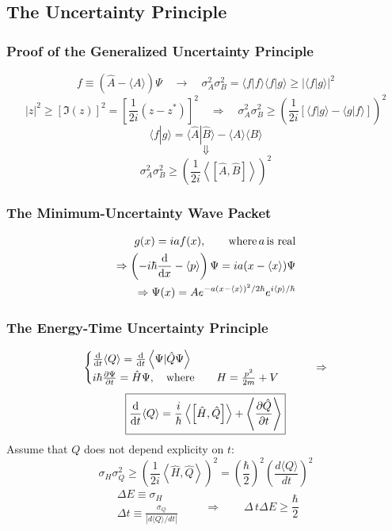 \documentclass[a4paper,12pt]{article}
\begin{document}
\subsection{The Uncertainty Principle}
\subsubsection{Proof of the Generalized Uncertainty Principle}
\[ f\equiv\left(\hat{A}-\langle A\rangle\right)\Psi \quad\rightarrow\quad 
   \sigma_A^2\sigma_B^2=\langle f|f\rangle\langle f|g\rangle\geq|\langle f| g\rangle|^2
\]
\[ |z|^2\geq[\Im(z)]^2=\left[\frac{1}{2i}(z-z^*)\right] ^2 \quad\Rightarrow\quad
  \sigma_A^2\sigma_B^2\geq\left(\frac{1}{2i}\left[
         \langle f| g\rangle -\langle g|f \rangle
  \right] \right)^2      
\]
\[\langle f| g\rangle=\langle \hat{A}|\hat{B}\rangle-\langle A\rangle\langle B\rangle\]
\[\Downarrow\]
$${ \boxed{\sigma_A^2\sigma_B^2\geq \left(\frac{1}{2i}\left\langle \left[\hat{A},\hat{B}\right] \right\rangle \right)^2  } }$$

\subsubsection{The Minimum-Uncertainty Wave Packet}
\[\begin{aligned}
       g(x)=iaf(x),\qquad\text{where} \,a\, \text{is real} \\ \Rightarrow
       \left(-i\hbar\dv{x}-\langle p\rangle\right) \Psi = ia(x-\langle x\rangle)\Psi \\ \Rightarrow
       \Psi(x) = Ae^{-a(x-\langle x\rangle)^2/2\hbar}e^{i\langle p\rangle/\hbar}
\end{aligned}
\]
\subsubsection{The Energy-Time Uncertainty Principle}
\[\begin{cases}
       \dv{t}\langle Q\rangle = \dv{t}\left\langle \Psi|\hat{Q}\Psi\right\rangle \\
       i\hbar\frac{\partial\Psi}{\partial t} = \hat{H}\Psi,\quad\text{where} \qquad H=\frac{p^2}{2m}+V
\end{cases}  \qquad\Rightarrow\]
$${\boxed{ \dv{t}\langle Q\rangle =\frac{i}{\hbar}\left\langle \left[\hat{H},\hat{Q}\right] \right\rangle+\left\langle \frac{\partial\hat{Q}}{\partial t}\right\rangle    }}$$
Assume that \(Q\) does not depend explicity on \(t\):
\[
    \sigma_H\sigma_Q^2\geq\left(\frac{1}{2i}\left\langle \hat{H},\hat{Q}\right\rangle \right)^2 = \left(\frac{\hbar}{2}\right)^2\left(\frac{d\langle Q\rangle}{dt}\right)^2 
\]
$${\begin{aligned}
       \Delta E\equiv\sigma_H \\
       \Delta t\equiv\frac{\sigma_Q}{|d\langle Q\rangle/dt|} 
\end{aligned} \qquad \Rightarrow \qquad 
\Delta \,t\Delta E\geq \frac{\hbar}{2}}$$
\end{document}
